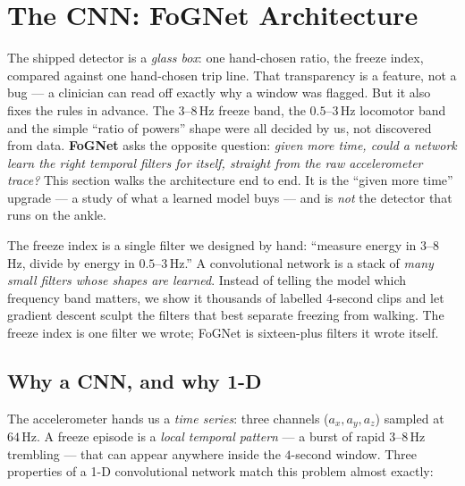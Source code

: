 \section{The CNN: FoGNet Architecture}
\label{sec:cnn}

The shipped detector is a \emph{glass box}: one hand-chosen ratio, the freeze index,
compared against one hand-chosen trip line. That transparency is a feature, not a
bug --- a clinician can read off exactly why a window was flagged. But it also fixes
the rules in advance. The $3$--$8$\,\unit{\hertz} freeze band, the $0.5$--$3$\,\unit{\hertz}
locomotor band and the simple ``ratio of powers'' shape were all decided by us, not
discovered from data. \textbf{FoGNet} asks the opposite question: \emph{given more
time, could a network learn the right temporal filters for itself, straight from the
raw accelerometer trace?} This section walks the architecture end to end. It is the
``given more time'' upgrade --- a study of what a learned model buys --- and is
\emph{not} the detector that runs on the ankle.

\begin{intuition}
The freeze index is a single filter we designed by hand: ``measure energy in
$3$--$8$\,\unit{\hertz}, divide by energy in $0.5$--$3$\,\unit{\hertz}.'' A
convolutional network is a stack of \emph{many small filters whose shapes are
learned}. Instead of telling the model which frequency band matters, we show it
thousands of labelled $4$-second clips and let gradient descent sculpt the filters
that best separate freezing from walking. The freeze index is one filter we wrote;
FoGNet is sixteen-plus filters it wrote itself.
\end{intuition}

\subsection{Why a CNN, and why 1-D}

The accelerometer hands us a \emph{time series}: three channels ($a_x, a_y, a_z$)
sampled at $64$\,\unit{\hertz}. A freeze episode is a \emph{local temporal pattern} ---
a burst of rapid $3$--$8$\,\unit{\hertz} trembling --- that can appear anywhere inside
the $4$-second window. Three properties of a 1-D convolutional network match this
problem almost exactly:

